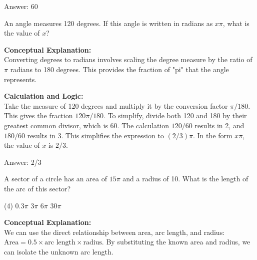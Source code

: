\documentclass[11pt,paper=a4,answers]{exam}
\begin{document}
\begin{questions}
\begin{solution}
\vspace{30pt}

Answer: \colorbox{yellow!100}{60}
\end{solution}

\vspace{60pt}

\question
An angle measures 120 degrees. If this angle is written in radians as $x\pi$, what is the value of $x$?

\begin{solution}
\textbf{Conceptual Explanation:} \\
Converting degrees to radians involves scaling the degree measure by the ratio of $\pi$ radians to 180 degrees. This provides the fraction of "pi" that the angle represents.

\vspace{30pt}

\textbf{Calculation and Logic:} \\
Take the measure of 120 degrees and multiply it by the conversion factor $\pi / 180$. This gives the fraction $120\pi / 180$. To simplify, divide both 120 and 180 by their greatest common divisor, which is 60. The calculation $120 / 60$ results in 2, and $180 / 60$ results in 3. This simplifies the expression to $(2/3)\pi$. In the form $x\pi$, the value of $x$ is $2/3$.

\vspace{30pt}

Answer: \colorbox{yellow!100}{2/3}
\end{solution}

\vspace{60pt}

\question
A sector of a circle has an area of $15\pi$ and a radius of 10. What is the length of the arc of this sector?
\begin{tasks}(4)
    \task $0.3\pi$
    \task $3\pi$
    \task $6\pi$
    \task $30\pi$
\end{tasks}

\begin{solution}
\textbf{Conceptual Explanation:} \\
We can use the direct relationship between area, arc length, and radius: $\text{Area} = 0.5 \times \text{arc length} \times \text{radius}$. By substituting the known area and radius, we can isolate the unknown arc length.


\end{solution}
\end{questions}
\end{document}
